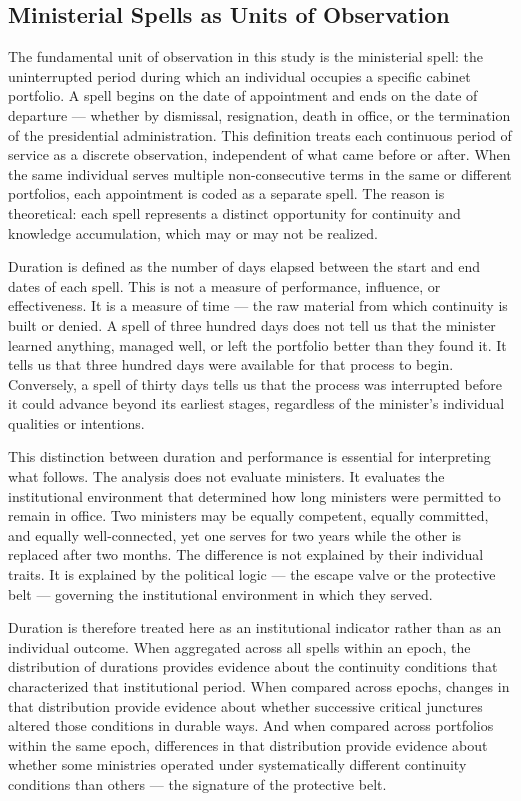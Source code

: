 \documentclass[doc, 12pt, a4paper,floatsintext]{apa7}
\begin{document}
\subsection{Ministerial Spells as Units of Observation}

The fundamental unit of observation in this study is the ministerial spell: 
the uninterrupted period during which an individual occupies a specific 
cabinet portfolio. A spell begins on the date of appointment and ends on 
the date of departure --- whether by dismissal, resignation, death in 
office, or the termination of the presidential administration. This 
definition treats each continuous period of service as a discrete 
observation, independent of what came before or after. When the same 
individual serves multiple non-consecutive terms in the same or different 
portfolios, each appointment is coded as a separate spell. The reason is 
theoretical: each spell represents a distinct opportunity for continuity 
and knowledge accumulation, which may or may not be realized.

Duration is defined as the number of days elapsed between the start and 
end dates of each spell. This is not a measure of performance, influence, 
or effectiveness. It is a measure of time --- the raw material from which 
continuity is built or denied. A spell of three hundred days does not 
tell us that the minister learned anything, managed well, or left the 
portfolio better than they found it. It tells us that three hundred days 
were available for that process to begin. Conversely, a spell of thirty 
days tells us that the process was interrupted before it could advance 
beyond its earliest stages, regardless of the minister's individual 
qualities or intentions.

This distinction between duration and performance is essential for 
interpreting what follows. The analysis does not evaluate ministers. It 
evaluates the institutional environment that determined how long ministers 
were permitted to remain in office. Two ministers may be equally competent, 
equally committed, and equally well-connected, yet one serves for two years 
while the other is replaced after two months. The difference is not 
explained by their individual traits. It is explained by the political 
logic --- the escape valve or the protective belt --- governing the 
institutional environment in which they served.

Duration is therefore treated here as an institutional indicator rather 
than as an individual outcome. When aggregated across all spells within 
an epoch, the distribution of durations provides evidence about the 
continuity conditions that characterized that institutional period. When 
compared across epochs, changes in that distribution provide evidence 
about whether successive critical junctures altered those conditions in 
durable ways. And when compared across portfolios within the same epoch, 
differences in that distribution provide evidence about whether some 
ministries operated under systematically different continuity conditions 
than others --- the signature of the protective belt.
\end{document}
